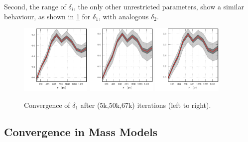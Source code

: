 Second, the range of $\delta_i$, the only other unrestricted
parameters, show a similar behaviour, as shown in
\ref{fig:convergencedelta1} for $\delta_1$, with analogous
$\delta_2$.

\begin{figure}
\begin{center}
\hspace{-7mm}
\includegraphics[width=0.3\textwidth]{fig/20130718132442_case_2_10000_0_cprior_nulog_denslog_mslope_rprior_5kit_profdelta1.pdf}
\includegraphics[width=0.3\textwidth]{fig/20130718132442_case_2_10000_0_cprior_nulog_denslog_mslope_rprior_50kit_profdelta1.pdf}
\includegraphics[width=0.3\textwidth]{fig/20130718132442_case_2_10000_0_cprior_nulog_denslog_mslope_rprior_67kit_profdelta1.pdf}
\caption{Convergence of $\delta_1$ after (5k,50k,67k) iterations (left to right).}
\label{fig:convergencedelta1}
\end{center}
\end{figure}





\subsection{Convergence in Mass Models}



